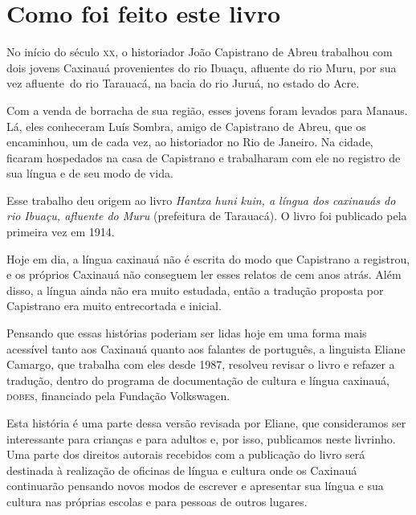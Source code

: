 
\chapter{Como foi feito este livro}

No início do século \textsc{xx}, o historiador João Capistrano de Abreu trabalhou
com dois jovens Caxinauá provenientes do rio Ibuaçu, afluente do rio Muru, por sua vez afluente~do rio Tarauacá, na bacia do rio Juruá, no estado do Acre.

Com a venda de borracha de sua região, esses jovens foram levados para Manaus. Lá, eles conheceram Luís Sombra, amigo de Capistrano de Abreu, que os encaminhou, um de cada vez, ao historiador no Rio de Janeiro. Na cidade, ficaram hospedados na casa de Capistrano e trabalharam com ele no registro de sua língua e de seu modo de vida.


Esse trabalho deu origem ao livro \textit{Hantxa huni kuin, a língua dos caxinauás do rio Ibuaçu, afluente do Muru} (prefeitura de Tarauacá). O livro foi publicado pela primeira vez em 1914.

Hoje em dia, a língua caxinauá não é escrita do modo que Capistrano a
registrou, e os próprios Caxinauá não conseguem ler esses relatos de
cem anos atrás. Além disso, a língua ainda não era muito estudada, então
a tradução proposta por Capistrano era muito entrecortada e inicial.


Pensando que essas histórias poderiam ser lidas hoje em uma forma mais acessível tanto aos Caxinauá quanto aos falantes de português, a linguista Eliane Camargo, que
trabalha com eles desde 1987, resolveu revisar o livro e refazer a tradução, dentro do programa de documentação de cultura e língua caxinauá, \textsc{dobes}, financiado pela
Fundação Volkswagen.

Esta história é uma parte dessa versão revisada por Eliane, que consideramos ser interessante para crianças e para adultos e, por isso, publicamos neste livrinho. Uma parte dos direitos autorais recebidos com a publicação do livro será destinada à realização de oficinas de língua e cultura onde os Caxinauá continuarão pensando novos modos de escrever e apresentar sua língua e sua cultura nas próprias escolas e para pessoas de outros lugares.



